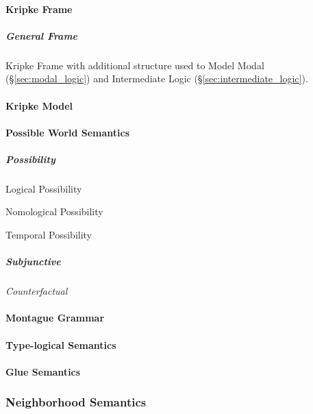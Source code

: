 \paragraph{Kripke Frame}\label{sec:kripke_frame}\hfill

\subparagraph{General Frame}\label{sec:general_frame}\hfill

Kripke Frame with additional structure used to Model Modal
(\S\ref{sec:modal_logic}) and Intermediate Logic
(\S\ref{sec:intermediate_logic}).



\paragraph{Kripke Model}\label{sec:kripke_model}\hfill

\paragraph{Possible World Semantics}\label{sec:possible_world}\hfill

\subparagraph{Possibility}\label{sec:possibility}\hfill

Logical Possibility

Nomological Possibility

Temporal Possibility

\subparagraph{Subjunctive}\label{sec:subjunctive}\hfill

\emph{Counterfactual}



\paragraph{Montague Grammar}\label{sec:montague_grammar}\hfill

\paragraph{Type-logical Semantics}\label{sec:typelogical_semantics}\hfill

\paragraph{Glue Semantics}\label{sec:glue_semantics}\hfill



\subsubsection{Neighborhood Semantics}
\label{sec:neighborhood_semantics}

